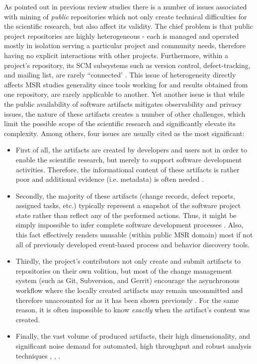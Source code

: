 As pointed out in previous review studies \cite{citeulike:12550438} \cite{citeulike:7853299} \cite{citeulike:7465518} there
is a number of issues associated with mining of \textit{public} repositories which not only create technical difficulties for 
the scientific research, but also affect its validity. 
The chief problem is that public project repositories are highly heterogeneous - each is managed and operated 
mostly in isolation serving a particular project and community needs, therefore having no explicit interactions with 
other projects. 
Furthermore, within a project's repository, its SCM subsystems such as version control, defect-tracking, and mailing list, 
are rarely ``connected'  \cite{citeulike:13058334}. 
This issue of heterogeneity directly affects MSR studies generality since tools working for and results obtained from 
one repository, are rarely applicable to another.
Yet another issue is that while the public availability of software artifacts mitigates observability and privacy issues, 
the nature of these artifacts creates a number of other challenges, which limit the possible scope of the scientific 
research and significantly elevate its complexity. Among others, four issues are usually cited as the most significant:
\begin{itemize}
 \item First of all, the artifacts are created by developers and users not in order to enable the scientific research,
but merely to support software development activities. Therefore, the informational content of these artifacts is rather 
poor and additional evidence (i.e. metadata) is often needed \cite{citeulike:342840} \cite{citeulike:7954249} 
\cite{citeulike:7260421}.
 \item Secondly, the majority of these artifacts (change records, defect reports, assigned tasks, etc.) 
typically represent a snapshot of the software project state rather than reflect any of the performed actions.
Thus, it might be simply impossible to infer complete software development processes \cite{citeulike:1296888}.
Also, this fact effectively renders unusable (within public MSR domain) most if not all of previously developed 
event-based process and behavior discovery tools.
 \item Thirdly, the project's contributors not only create and submit artifacts to repositories on their own volition,
but most of the change management system (such as Git, Subversion, and Gerrit) encourage the asynchronous workflow 
where the locally created artifacts may remain uncommitted and therefore unaccounted for as it has been shown previously
\cite{citeulike:2280690} \cite{citeulike:9037939}. 
For the same reason, it is often impossible to know \textit{exactly} when the artifact's content was created.
 \item Finally, the vast volume of produced artifacts, their high dimensionality, and significant noise demand 
 for automated, high throughput and robust analysis techniques 
 \cite{citeulike:12550438}, \cite{citeulike:7853299}, \cite{citeulike:4534888}.
\end{itemize}

